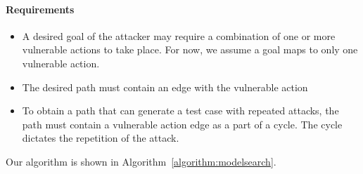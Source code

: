 \paragraph{Requirements}  
\begin{itemize}
  \item
  A desired goal of the attacker may require a combination of one or more vulnerable actions to take place. 
  For now, we assume a goal maps to only one vulnerable action.
  \item
  The desired path must contain an edge with the vulnerable action
  \item
  To obtain a path that can generate a test case with repeated attacks, 
  the path must contain a vulnerable action edge as a part of a cycle. 
  The cycle dictates the repetition of the attack.
\end{itemize}

Our algorithm is shown in Algorithm~\ref{algorithm:modelsearch}.

